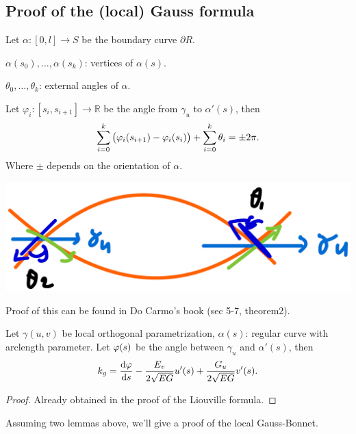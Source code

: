 \subsection{Proof of the (local) Gauss formula}
\begin{lemma}
    Let \(\alpha\colon [0,l]\to S\) be the boundary curve
    \(\partial R\).
    
    \(\alpha(s_0),\ldots,\alpha(s_k)\):
    vertices of \(\alpha(s)\).

    \(\theta_0,\ldots,\theta_k\): external angles of \(\alpha\).

    Let \(\varphi_i\colon [s_i,s_{i+1}]\to \mathbb{R}\)
    be the angle from \(\gamma_u\) to \(\alpha'(s)\),
    then 
    \[\sum_{i=0}^k \left(\varphi_i(s_{i+1})-\varphi_i(s_i)\right)
    +\sum_{i=0}^k \theta_i=\pm 2 \pi.\]
    Where \(\pm\) depends on the orientation of \(\alpha\).
    \label{lemma 1 of local Gauss-Bonnet}
\end{lemma}
\begin{center}
    \includegraphics[scale=0.3]{picture/week13/topological result.png}
\end{center}
Proof of this can be found in Do Carmo's book (sec 5-7, theorem2).
\begin{lemma}
    \label{lemma 2 of local Gauss-Bonnet}
    Let \(\gamma(u,v)\) be local orthogonal parametrization,
    \(\alpha(s)\): regular curve with arclength parameter.
    Let \(\varphi(s)\) be the angle between \(\gamma_u\) and \(\alpha'(s)\),
    then
    \[
        k_g=\dv{\varphi}{s}-\frac{E_v}{2\sqrt{E G}}u'(s)+
        \frac{G_u}{2\sqrt{EG}}v'(s).
    \]
\end{lemma}
\begin{proof}
    Already obtained in the proof of the Liouville formula.
\end{proof}
Assuming two lemmas above, we'll give a proof of the local Gauss-Bonnet.
